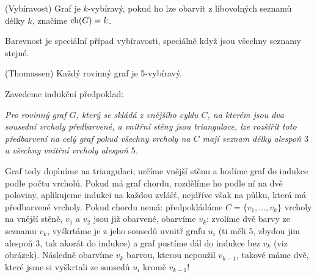 \df (Vybíravost) Graf je $k$-vybíravý, pokud ho lze obarvit z libovolných
seznamů délky
$k$, značíme $\operatorname{ch}(G) = k$.

\poz Barevnost je speciální případ vybíravosti, speciálně když jsou všechny
seznamy stejné.

\vt (Thomassen) Každý rovinný graf je 5-vybíravý.

\dk Zavedeme indukční předpoklad:

{\it Pro rovinný graf $G$, který se skládá z vnějšího cyklu $C$, na kterém jsou
	dva sousední vrcholy předbarvené, a vnitřní stěny jsou triangulace, lze
	rozšířit toto předbarvení na celý graf pokud všechny vrcholy na $C$ mají
seznam délky alespoň $3$ a všechny vnitřní vrcholy alespoň $5$.}

Graf tedy doplníme na triangulaci, určíme vnější stěnu a hodíme graf do indukce
podle počtu vrcholů. Pokud má graf chordu, rozdělíme ho podle ní na dvě
poloviny, aplikujeme indukci na každou zvlášť, nejdříve však na půlku, která má
předbarvené vrcholy. Pokud chordu nemá: předpokládáme $C=\{v_1, \dots, v_k\}$
vrcholy na vnější stěně, $v_1$ a $v_2$ jsou již obarvené, obarvíme $v_k$:
zvolíme dvě barvy ze seznamu $v_k$, vyškrtáme
je z jeho sousedů uvnitř grafu $u_i$ (ti měli 5, zbydou jim alespoň 3, tak
akorát do indukce) a graf pustíme dál do indukce bez $v_k$ (viz obrázek).
Následně obarvíme $v_k$ barvou, kterou nepoužil $v_{k-1}$, takové máme dvě,
které jsme si vyškrtali ze sousedů $u_i$ kromě $v_{k-1}$!

